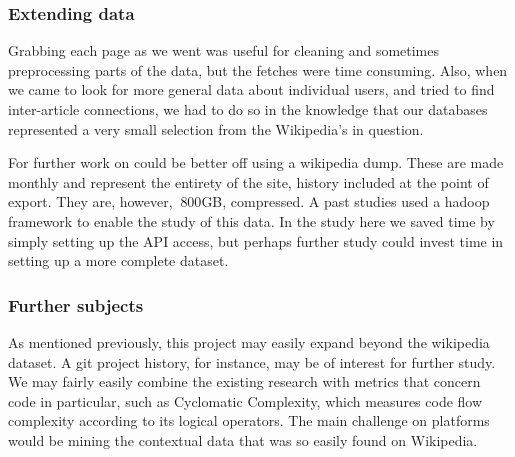 \subsubsection*{Extending data}
Grabbing each page as we went was useful for cleaning and sometimes
preprocessing parts of the data, but the fetches were time
consuming. Also, when we came to look for more general data about
individual users, and tried to find inter-article connections, we had
to do so in the knowledge that our databases represented a very small
selection from the Wikipedia's in question.

For further work on could be better off using a wikipedia dump. These
are made monthly and represent the entirety of the site, history
included at the point of export. They are, however, $~800$GB,
compressed.\cite{wiki-dump} A past studies used a hadoop framework
to enable the study of this data. In the study here we saved time by
simply setting up the API access, but perhaps further study could
invest time in setting up a more complete dataset.

\subsubsection*{Further subjects}
As mentioned previously, this project may easily expand beyond the
wikipedia dataset. A git project history, for instance, may be of
interest for further study. We may fairly easily combine the existing
research with metrics that concern code in particular, such as
Cyclomatic Complexity, which measures code flow complexity according
to its logical operators.\cite{McCabe1976} The main challenge on
platforms would be mining the contextual data that was so easily found
on Wikipedia.
